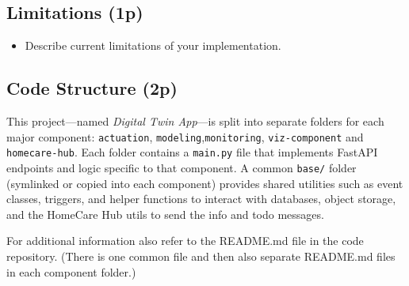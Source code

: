 \documentclass[A4,10pt]{article}
\begin{document}
\subsection{ Limitations (1p)}

\begin{itemize}
	\item Describe current limitations of your implementation.
\end{itemize}


\subsection{Code Structure (2p)}
\label{sec:code_structure}

This project---named \textit{Digital Twin App}---is split into separate folders for each major component: 
\texttt{actuation}, \texttt{modeling},\texttt{monitoring}, \texttt{viz-component} and \texttt{homecare-hub}. Each folder contains a \texttt{main.py} file
that implements FastAPI endpoints and logic specific to that component.
A common \texttt{base/} folder (symlinked or copied into each component) provides shared utilities 
such as event classes, triggers, and helper functions to interact with databases, object storage, 
and the HomeCare Hub utils to send the info and todo messages.

For additional information also refer to the README.md file in the code repository. (There is one common file and then also separate README.md files in each component folder.)
\end{document}
